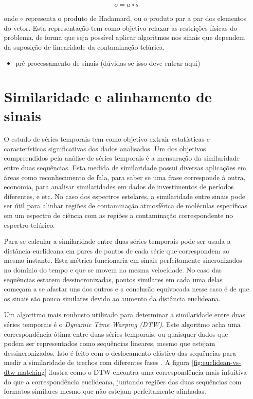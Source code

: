 \begin{equation*}
    o = a \circ s
\end{equation*}

onde $\circ$ representa o produto de Hadamard, ou o produto par a par dos elementos do vetor. Esta representação tem como objetivo relaxar as restrições físicas do problema, de forma que seja possível aplicar algoritmos nos sinais que dependem da suposição de linearidade da contaminação telúrica.


\begin{itemize}
    \item pré-processamento de sinais (dúvidas se isso deve entrar aqui)
\end{itemize}


\section{Similaridade e alinhamento de sinais}

O estudo de séries temporais tem como objetivo extrair estatísticas e características significativas dos dados analisados. Um dos objetivos compreendidos pela análise de séries temporais é a mensuração da similaridade entre duas sequências. Esta medida de similaridade possui diversas aplicações em áreas como reconhecimento de fala, para saber se uma frase corresponde à outra, economia, para analisar similaridades em dados de investimentos de períodos diferentes, e etc. No caso dos espectros estelares, a similaridade entre sinais pode ser útil para alinhar regiões de contaminação atmosférica de moléculas específicas em um espectro de ciência com as regiões a contaminação correspondente no espectro telúrico.

Para se calcular a similaridade entre duas séries temporais pode ser usada a distância euclideana em pares de pontos de cada série que correspondem ao mesmo instante. Esta métrica funcionaria em sinais perfeitamente sincronizados no domínio do tempo e que se movem na mesma velocidade. No caso das sequências estarem dessincronizadas, pontos similares em cada uma delas começam a se afastar uns dos outros e a conclusão equivocada nesse caso é de que os sinais são pouco similares devido ao aumento da distância euclideana.

Um algoritmo mais roubusto utilizado para determinar a similaridade entre duas séries temporais é o \textit{Dynamic Time Warping (DTW)}. Este algoritmo acha uma correspondência ótima entre duas séries temporais, ou quaisquer dados que podem ser representados como sequências lineares, mesmo que estejam dessincronizados. Isto é feito com o deslocamento elástico das sequências para medir a similaridade de trechos com diferentes fases \citep{shou2005fast}. A figura \ref{fig:euclidean-vs-dtw-matching} ilustra como o DTW encontra uma correspondência mais intuitiva do que a correspondência euclideana, juntando regiões das duas sequências com formatos similares mesmo que não estejam perfeitamente alinhadas.

